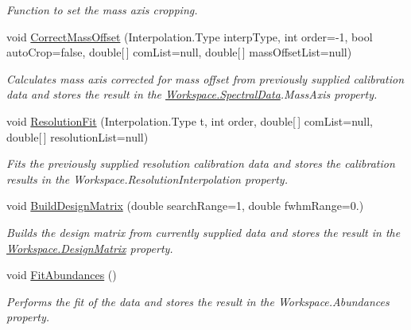 \begin{DoxyCompactItemize}
\begin{DoxyCompactList}\small\item\em Function to set the mass axis cropping. \end{DoxyCompactList}\item 
void \hyperlink{class_isotope_fit_1_1_workspace_a188d75c84db3eb6b5c3812e44eb95695}{Correct\+Mass\+Offset} (Interpolation.\+Type interp\+Type, int order=-\/1, bool auto\+Crop=false, double\mbox{[}$\,$\mbox{]} com\+List=null, double\mbox{[}$\,$\mbox{]} mass\+Offset\+List=null)
\begin{DoxyCompactList}\small\item\em Calculates mass axis corrected for mass offset from previously supplied calibration data and stores the result in the \hyperlink{class_isotope_fit_1_1_workspace_a1d6cc2dd07cbfe920da9f1bffc9b32c2}{Workspace.\+Spectral\+Data}.Mass\+Axis property. \end{DoxyCompactList}\item 
void \hyperlink{class_isotope_fit_1_1_workspace_a00c1ae2e3b1d443808bef150a1e99410}{Resolution\+Fit} (Interpolation.\+Type t, int order, double\mbox{[}$\,$\mbox{]} com\+List=null, double\mbox{[}$\,$\mbox{]} resolution\+List=null)
\begin{DoxyCompactList}\small\item\em Fits the previously supplied resolution calibration data and stores the calibration results in the Workspace.\+Resolution\+Interpolation property. \end{DoxyCompactList}\item 
void \hyperlink{class_isotope_fit_1_1_workspace_a760f024c67d57242c40c558298bd1878}{Build\+Design\+Matrix} (double search\+Range=1, double fwhm\+Range=0.)
\begin{DoxyCompactList}\small\item\em Builds the design matrix from currently supplied data and stores the result in the \hyperlink{class_isotope_fit_1_1_workspace_ae24a2ee8f965fb2ed7ad3a592163271d}{Workspace.\+Design\+Matrix} property. \end{DoxyCompactList}\item 
void \hyperlink{class_isotope_fit_1_1_workspace_a40fa9b2c0b5d31feae1093d08b1aad52}{Fit\+Abundances} ()
\begin{DoxyCompactList}\small\item\em Performs the fit of the data and stores the result in the Workspace.\+Abundances property. \end{DoxyCompactList}\end{DoxyCompactItemize}
